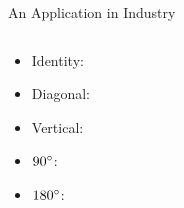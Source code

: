 \documentclass{beamer}
\begin{document}
\begin{frame}{An Application in Industry}
\begin{columns}
    \hfill%
    \begin{column}{.38\textwidth}
      \begin{itemize}
        \setcounter{beamerpauses}{1} %
        \item<+-> Identity: 
        \item<+-> Diagonal: \addtocounter{beamerpauses}{6}
        \item<+-> Vertical: \addtocounter{beamerpauses}{5} 
        \item<+-> $90\degree$: \addtocounter{beamerpauses}{4}
        \item<+-> $180\degree$: \addtocounter{beamerpauses}{6}
      \end{itemize}
    \end{column}%
  \end{columns}
\end{frame}
\end{document}
